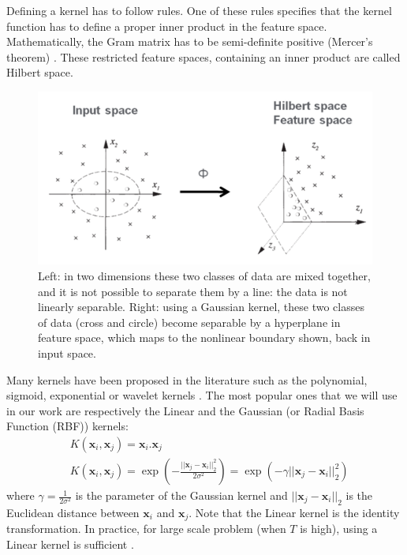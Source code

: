 \noindent Defining a kernel has to follow rules. One of these rules specifies that the kernel function has to define a proper inner product in the feature space. Mathematically, the Gram matrix has to be semi-definite positive (Mercer's theorem) \cite{Schlkopf2013}. These restricted feature spaces, containing an inner product are called Hilbert space.


\begin{figure}[h!]
\centering
\includegraphics[width=0.9\linewidth]{images/SVM_nonlinear}
\caption{Left: in two dimensions these two classes of data are mixed together, and it is not possible to separate them by a line: the data is not linearly separable. Right: using a Gaussian kernel, these two classes of data (cross and circle) become separable by a hyperplane in feature space, which maps to the nonlinear boundary shown, back in input space.}
\label{fig:SVM_nonlinear}
\end{figure}

Many kernels have been proposed in the literature such as the polynomial, sigmoid, exponential or wavelet kernels \cite{Schlkopf2013}. The most popular ones that we will use in our work are respectively the Linear and the Gaussian (or Radial Basis Function (RBF)) kernels:
\begin{align}
	& K(\textbf{x}_i,\textbf{x}_j)= \textbf{x}_i . \textbf{x}_j \\
	& K(\textbf{x}_i,\textbf{x}_j)
	= \exp(-\frac{||\textbf{x}_j-\textbf{x}_i||_2^2}{2\sigma^2})
	= \exp(-\gamma||\textbf{x}_j-\textbf{x}_i||_2^2)
\end{align}
where $\gamma = \frac{1}{2\sigma^2}$ is the parameter of the Gaussian kernel and $||\textbf{x}_j-\textbf{x}_i||_2$ is the Euclidean distance between $\textbf{x}_i$ and $\textbf{x}_j$. Note that the Linear kernel is the identity transformation. In practice, for large scale problem (when $T$ is high), using a Linear kernel is sufficient  \cite{Fan2008}.

